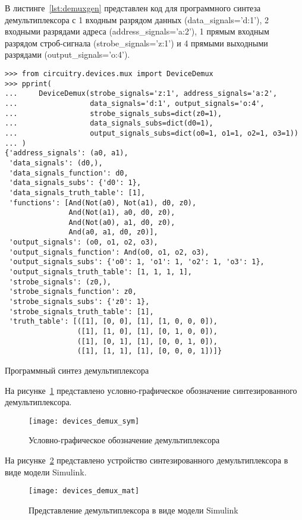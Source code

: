 \documentclass[document.tex]{subfiles}
\begin{document}
\clearpage

В листинге~\ref{lst:demuxgen} представлен код для программного синтеза
демультиплексора с 1 входным разрядом данных (data\_signals='d:1'), 2 входными
разрядами адреса (address\_signals='a:2'), 1 прямым входным разрядом
строб-сигнала (strobe\_signals='z:1') и 4 прямыми выходными разрядами
(output\_signals='o:4').

\begin{listing}[ht]
\begin{verbatim}
>>> from circuitry.devices.mux import DeviceDemux        
>>> pprint(                                                     
...     DeviceDemux(strobe_signals='z:1', address_signals='a:2',
...                 data_signals='d:1', output_signals='o:4',
...                 strobe_signals_subs=dict(z0=1),
...                 data_signals_subs=dict(d0=1),
...                 output_signals_subs=dict(o0=1, o1=1, o2=1, o3=1))
... )
{'address_signals': (a0, a1),
 'data_signals': (d0,),
 'data_signals_function': d0,
 'data_signals_subs': {'d0': 1},
 'data_signals_truth_table': [1],
 'functions': [And(Not(a0), Not(a1), d0, z0),
               And(Not(a1), a0, d0, z0),
               And(Not(a0), a1, d0, z0),
               And(a0, a1, d0, z0)],
 'output_signals': (o0, o1, o2, o3),
 'output_signals_function': And(o0, o1, o2, o3),
 'output_signals_subs': {'o0': 1, 'o1': 1, 'o2': 1, 'o3': 1},
 'output_signals_truth_table': [1, 1, 1, 1],
 'strobe_signals': (z0,),
 'strobe_signals_function': z0,
 'strobe_signals_subs': {'z0': 1},
 'strobe_signals_truth_table': [1],
 'truth_table': [([1], [0, 0], [1], [1, 0, 0, 0]),
                 ([1], [1, 0], [1], [0, 1, 0, 0]),
                 ([1], [0, 1], [1], [0, 0, 1, 0]),
                 ([1], [1, 1], [1], [0, 0, 0, 1])]}
\end{verbatim}
\caption{Программный синтез демультиплексора}
\label{lst:demuxgen}
\end{listing}

\clearpage

На рисунке~\ref{fig:devicedemux} представлено условно-графическое обозначение
синтезированного демультиплексора.

\begin{figure}[here]
\centering
\texttt{[image: devices\_demux\_sym]}
\caption{Условно-графическое обозначение демультиплексора}
\label{fig:devicedemux}
\end{figure}

На рисунке~\ref{fig:devicedemuxmat} представлено устройство
синтезированного демультиплексора в виде модели Simulink.

\begin{figure}[here]
\texttt{[image: devices\_demux\_mat]}
\caption{Представление демультиплексора в виде модели Simulink}
\label{fig:devicedemuxmat}
\end{figure}
\end{document}
